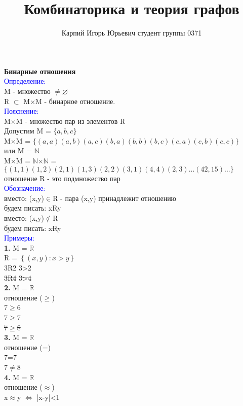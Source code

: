 \documentclass[a4paper,12pt]{article}   %
\title{Комбинаторика и теория графов}
\author{Карпий Игорь Юрьевич студент группы 0371}
\date{}
\begin{document}
\maketitle
\thispagestyle{empty}

\textbf{Бинарные отношения} \\
\textcolor{blue}{Определение:} \\
M - множество $\neq \varnothing$ \\
R $\subset$ M$\times$M - бинарное отношение. \\
\textcolor{blue}{Пояснение:} \\
M$\times$M - множество пар из элементов R \\
Допустим M = $\{a,b,c\}$ \\
M$\times$M = $\{(a,a)(a,b)(a,c)(b,a)(b,b)(b,c)(c,a)(c,b)(c,c)\}$ \\
или M = $\mathbb{N}$ \\
M$\times$M = $\mathbb{N}$$\times$$\mathbb{N}$ = $\{(1,1)(1,2)(2,1)(1,3)(2,2)(3,1)(4,4)(2,3)...(42,15)...\}$ \\
отношение R - это подмножество пар \\
\textcolor{blue}{Обозначение:} \\
вместо: (x,y)$\in$R - пара (x,y) принадлежит отношению \\
будем писать: xRy \\
вместо: (x,y)$\notin$R \\
будем писать: \sout{xRy} \\
\textcolor{blue}{Примеры:} \\
\textbf{1.} M = $\mathbb{R}$ \\ 
R = $\left\{(x,y): x > y\right\}$ \\
3R2 3>2 \\
\sout{3R4} \sout{3>4} \\
\textbf{2.} M = $\mathbb{R}$ \\ 
отношение ($\geq$) \\
7$\geq$6 \\
7$\geq$7 \\
\sout{7$\geq$8} \\
\textbf{3.} M = $\mathbb{R}$ \\
отношение (=) \\
7=7 \\
7$\neq$8 \\
\textbf{4.} M = $\mathbb{R}$ \\
отношение ($\approx$) \\
x$\approx$y $\iff$ |x-y|<1 \\
\end{document}
